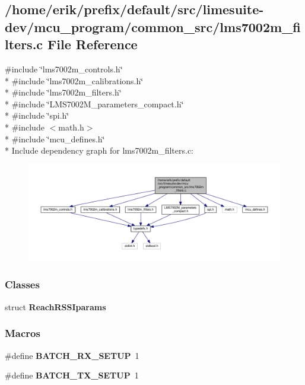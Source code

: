 \subsection{/home/erik/prefix/default/src/limesuite-\/dev/mcu\+\_\+program/common\+\_\+src/lms7002m\+\_\+filters.c File Reference}
\label{lms7002m__filters_8c}
{\ttfamily \#include \char`\"{}lms7002m\+\_\+controls.\+h\char`\"{}}\\*
{\ttfamily \#include \char`\"{}lms7002m\+\_\+calibrations.\+h\char`\"{}}\\*
{\ttfamily \#include \char`\"{}lms7002m\+\_\+filters.\+h\char`\"{}}\\*
{\ttfamily \#include \char`\"{}L\+M\+S7002\+M\+\_\+parameters\+\_\+compact.\+h\char`\"{}}\\*
{\ttfamily \#include \char`\"{}spi.\+h\char`\"{}}\\*
{\ttfamily \#include $<$math.\+h$>$}\\*
{\ttfamily \#include \char`\"{}mcu\+\_\+defines.\+h\char`\"{}}\\*
Include dependency graph for lms7002m\+\_\+filters.\+c\+:
\nopagebreak
\begin{figure}[H]
\begin{center}
\leavevmode
\includegraphics[width=350pt]{dd/d85/lms7002m__filters_8c__incl}
\end{center}
\end{figure}
\subsubsection*{Classes}
\begin{DoxyCompactItemize}
\item 
struct {\bf Reach\+R\+S\+S\+Iparams}
\end{DoxyCompactItemize}
\subsubsection*{Macros}
\begin{DoxyCompactItemize}
\item 
\#define {\bf B\+A\+T\+C\+H\+\_\+\+R\+X\+\_\+\+S\+E\+T\+UP}~1
\item 
\#define {\bf B\+A\+T\+C\+H\+\_\+\+T\+X\+\_\+\+S\+E\+T\+UP}~1
\end{DoxyCompactItemize}
